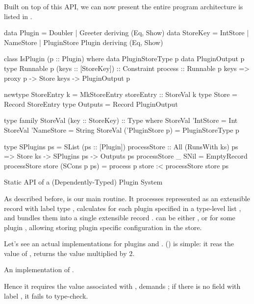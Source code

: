 \documentclass[demotion-paper.tex]{subfiles}
\begin{document}
Built on top of this API, we can now present the entire program architecture is listed in .
\begin{listing}[hptb]
\begin{code}
data Plugin = Doubler | Greeter deriving (Eq, Show)
data StoreKey = IntStore | NameStore | PluginStore Plugin deriving (Eq, Show)

class IsPlugin (p :: Plugin) where
  data PluginStoreType p
  data PluginOutput p
  type Runnable p (keys :: [StoreKey]) :: Constraint
  process :: Runnable p keys => proxy p -> Store keys -> PluginOutput p

newtype StoreEntry k = MkStoreEntry {storeEntry :: StoreVal k}
type Store = Record StoreEntry
type Outputs = Record PluginOutput

type family StoreVal (key :: StoreKey) :: Type where
  StoreVal 'IntStore = Int
  StoreVal 'NameStore = String
  StoreVal ('PluginStore p) = PluginStoreType p

type SPlugins ps = SList (ps :: [Plugin])
processStore :: All (RunsWith ks) ps => Store ks -> SPlugins ps -> Outputs ps
processStore _ SNil = EmptyRecord
processStore store (SCons p ps) = process p store :< processStore store ps
\end{code}
\caption{Static API of a (Dependently-Typed) Plugin System}
\label{lst:plugin-arch}
\end{listing}
As described before,  is our main routine.
It processes  represented as an extensible record with label type , calculates  for each plugin specified in a type-level list , and bundles them into a single extensible record .
 can be either ,  or  for some plugin , allowing storing plugin specific configuration in the store.

Let's see an actual implementations for plugins  and .
 () is simple: it reas the value of , returns the value multiplied by $2$.
\begin{listing}[htbp]
\caption{An implementation of .}
\label{lst:plugin-double}
\end{listing}
Hence it requires the value associated with ,  demands ; if there is no field with label , it fails to type-check.
\end{document}
